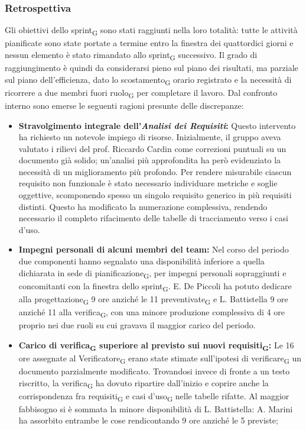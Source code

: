 ﻿\documentclass[a4paper, 10pt, colorlinks=true, linkcolor=black, urlcolor=blue, citecolor=blue, hidelinks]{article}
\begin{document}
\subsubsection{Retrospettiva}
Gli obiettivi dello sprint\textsubscript{G} sono stati raggiunti nella loro totalità: tutte le attività pianificate sono state portate a termine entro la finestra dei quattordici giorni e nessun elemento è stato rimandato allo sprint\textsubscript{G} successivo. Il grado di raggiungimento è quindi da considerarsi pieno sul piano dei risultati, ma parziale sul piano dell'efficienza, dato lo scostamento\textsubscript{G} orario registrato e la necessità di ricorrere a due membri fuori ruolo\textsubscript{G} per completare il lavoro. Dal confronto interno sono emerse le seguenti ragioni presunte delle discrepanze:
\begin{itemize}
    \item \textbf{Stravolgimento integrale dell'\textit{Analisi dei Requisiti}:} Questo intervento ha richiesto un notevole impiego di risorse. Inizialmente, il gruppo aveva valutato i rilievi del prof. Riccardo Cardin come correzioni puntuali su un documento già solido; un'analisi più approfondita ha però evidenziato la necessità di un miglioramento più profondo. Per rendere misurabile ciascun requisito non funzionale è stato necessario individuare metriche e soglie oggettive, scomponendo spesso un singolo requisito generico in più requisiti distinti. Questo ha modificato la numerazione complessiva, rendendo necessario il completo rifacimento delle tabelle di tracciamento verso i casi d’uso. 
    \item \textbf{Impegni personali di alcuni membri del team:} Nel corso del periodo due componenti hanno segnalato una disponibilità inferiore a quella dichiarata in sede di pianificazione\textsubscript{G}, per impegni personali sopraggiunti e concomitanti con la finestra dello sprint\textsubscript{G}. E. De Piccoli ha potuto dedicare alla progettazione\textsubscript{G} 9 ore anziché le 11 preventivate\textsubscript{G} e L. Battistella 9 ore anziché 11 alla verifica\textsubscript{G}, con una minore produzione complessiva di 4 ore proprio nei due ruoli su cui gravava il maggior carico del periodo.

    \item \textbf{Carico di verifica\textsubscript{G} superiore al previsto sui nuovi requisiti\textsubscript{G}:} Le 16 ore assegnate al Verificatore\textsubscript{G} erano state stimate sull'ipotesi di verificare\textsubscript{G} un documento parzialmente modificato. Trovandosi invece di fronte a un testo riscritto, la verifica\textsubscript{G} ha dovuto ripartire dall'inizio e coprire anche la corrispondenza fra requisiti\textsubscript{G} e casi d'uso\textsubscript{G} nelle tabelle rifatte. Al maggior fabbisogno si è sommata la minore disponibilità di L. Battistella: A. Marini ha assorbito entrambe le cose rendicontando 9 ore anziché le 5 previste;


\end{itemize}
\end{document}
